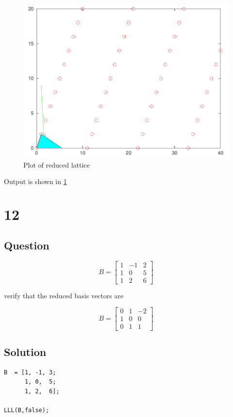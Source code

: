 \documentclass[11pt,a4paper,final]{article}
\begin{document}
\begin{figure}[htbp]
\centering
\includegraphics[width=.9\linewidth]{./lattice.png}
\caption{\label{fig:reduced}Plot of reduced lattice}
\end{figure}

Output is shown in \ref{fig:reduced}

\pagebreak
\section{12}
\label{sec:orgd2989d7}
\subsection{Question}
\label{sec:org1d079c2}
\begin{equation}
B =
\begin{bmatrix}
1 & -1 & 2 \\
1 & 0 & 5 \\
1 & 2 & 6
\end{bmatrix}
\end{equation}

verify that the reduced basis vectors are

\begin{equation}
B =
\begin{bmatrix}
0 & 1 & -2 \\
1 & 0 & 0 \\
0 & 1 & 1
\end{bmatrix}
\end{equation}

\subsection{Solution}
\label{sec:org6321ee5}
\begin{verbatim}
B  = [1, -1, 3;
      1, 0,  5;
      1, 2,  6];

LLL(B,false);
\end{verbatim}
\end{document}
